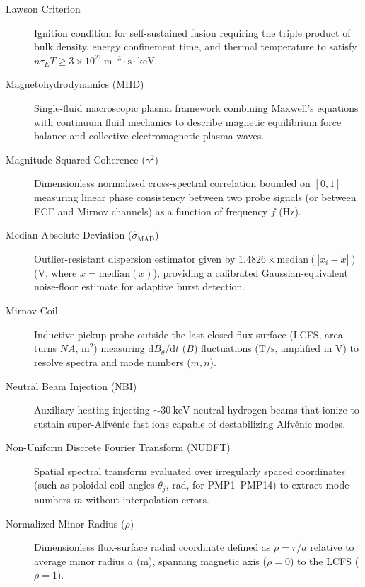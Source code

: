 \begin{description}
\item[Lawson Criterion] Ignition condition for self-sustained fusion requiring the triple product of bulk density, energy confinement time, and thermal temperature to satisfy $n \tau_E T \ge 3 \times 10^{21}\,\mathrm{m^{-3}\cdot s\cdot keV}$.

\item[Magnetohydrodynamics (MHD)] Single-fluid macroscopic plasma framework combining Maxwell's equations with continuum fluid mechanics to describe magnetic equilibrium force balance and collective electromagnetic plasma waves.

\item[Magnitude-Squared Coherence ($\gamma^2$)] Dimensionless normalized cross-spectral correlation bounded on $[0, 1]$ measuring linear phase consistency between two probe signals (or between ECE and Mirnov channels) as a function of frequency $f$ ($\mathrm{Hz}$).

\item[Median Absolute Deviation ($\hat{\sigma}_{\mathrm{MAD}}$)] Outlier-resistant dispersion estimator given by $1.4826 \times \mathrm{median}(|x_i - \tilde{x}|)$ ($\mathrm{V}$, where $\tilde{x} = \mathrm{median}(x)$), providing a calibrated Gaussian-equivalent noise-floor estimate for adaptive burst detection.

\item[Mirnov Coil] Inductive pickup probe outside the last closed flux surface (LCFS, area-turns $N A$, $\mathrm{m^2}$) measuring $\mathrm{d}\tilde{B}_\theta/\mathrm{d}t$ ($\dot{B}$) fluctuations ($\mathrm{T}/\mathrm{s}$, amplified in $\mathrm{V}$) to resolve spectra and mode numbers ($m, n$).

\item[Neutral Beam Injection (NBI)] Auxiliary heating injecting $\sim 30~\mathrm{keV}$ neutral hydrogen beams that ionize to sustain super-Alfv\'{e}nic fast ions capable of destabilizing Alfv\'{e}nic modes.

\item[Non-Uniform Discrete Fourier Transform (NUDFT)] Spatial spectral transform evaluated over irregularly spaced coordinates (such as poloidal coil angles $\theta_j$, $\mathrm{rad}$, for PMP1--PMP14) to extract mode numbers $m$ without interpolation errors.

\item[Normalized Minor Radius ($\rho$)] Dimensionless flux-surface radial coordinate defined as $\rho = r/a$ relative to average minor radius $a$ ($\mathrm{m}$), spanning magnetic axis ($\rho = 0$) to the LCFS ($\rho = 1$).


\end{description}

